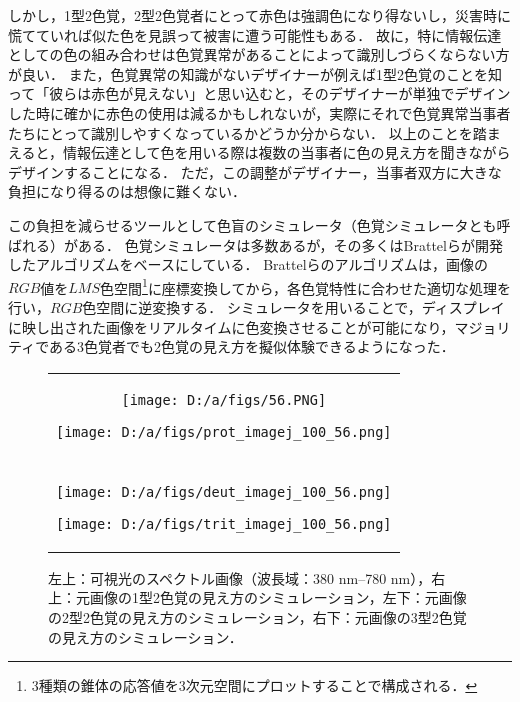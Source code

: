 \documentclass[uplatex,paper=a4,fontsize=4.0truemm,jafontsize=4.0truemm,head_space=30.0truemm,foot_space=30.0truemm,baselineskip=8.0truemm,line_length=40zw,gutter=25.0truemm,oneside,openany,fleqn,hanging_panctuation,open_bracket_pos=nibu_tentsuki,dvipdfmx,jis2004,book,titlepage]{jlreq}
\theoremstyle{mystyle}
\newcommand{\captiondot}[1]{\caption{#1．}}
\newcommand{\mathdisplaystyle}[1]{\(\displaystyle{#1}\)}
\begin{document}
			しかし，1型2色覚，2型2色覚者にとって赤色は強調色になり得ないし，災害時に慌てていれば似た色を見誤って被害に遭う可能性もある．
			故に，特に情報伝達としての色の組み合わせは色覚異常があることによって識別しづらくならない方が良い．
			また，色覚異常の知識がないデザイナーが例えば1型2色覚のことを知って「彼らは赤色が見えない」と思い込むと，そのデザイナーが単独でデザインした時に確かに赤色の使用は減るかもしれないが，実際にそれで色覚異常当事者たちにとって識別しやすくなっているかどうか分からない．
			以上のことを踏まえると，情報伝達として色を用いる際は複数の当事者に色の見え方を聞きながらデザインすることになる．
			ただ，この調整がデザイナー，当事者双方に大きな負担になり得るのは想像に難くない．

			この負担を減らせるツールとして色盲のシミュレータ（色覚シミュレータとも呼ばれる）がある．
			色覚シミュレータは多数あるが，その多くはBrattelらが開発したアルゴリズム\cite{Brettel1997}をベースにしている．
			Brattelらのアルゴリズムは，画像の\mathdisplaystyle{RGB}値を\mathdisplaystyle{LMS}色空間\footnote{3種類の錐体の応答値を3次元空間にプロットすることで構成される．}に座標変換してから，各色覚特性に合わせた適切な処理を行い，\mathdisplaystyle{RGB}色空間に逆変換する．
			シミュレータを用いることで，ディスプレイに映し出された画像をリアルタイムに色変換させることが可能になり，マジョリティである3色覚者でも2色覚の見え方を擬似体験できるようになった．
			\begin{figure}[tbp]
				\centering
				\begin{tabular}{c}
					\begin{minipage}{0.5\linewidth}
						\centering
						\texttt{[image: D:/a/figs/56.PNG]}
					\end{minipage}
					\begin{minipage}{0.5\linewidth}
						\centering
						\texttt{[image: D:/a/figs/prot\_imagej\_100\_56.png]}
					\end{minipage} \\
					\begin{minipage}{0.06\linewidth}
						\vspace{10truemm}
					\end{minipage} \\
					\begin{minipage}{0.5\linewidth}
						\centering
						\texttt{[image: D:/a/figs/deut\_imagej\_100\_56.png]}
					\end{minipage}
					\begin{minipage}{0.5\linewidth}
						\centering
						\texttt{[image: D:/a/figs/trit\_imagej\_100\_56.png]}
					\end{minipage}
				\end{tabular}
				\captiondot{左上：可視光のスペクトル画像（波長域：380 nm--780 nm），右上：元画像の1型2色覚の見え方のシミュレーション，左下：元画像の2型2色覚の見え方のシミュレーション，右下：元画像の3型2色覚の見え方のシミュレーション}\label{fig:spect}
			\end{figure}
\end{document}
